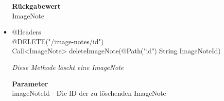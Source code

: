 \begin{itemize}
        		\textbf{Rückgabewert} \\
                ImageNote
                
                     \item{@Headers\\ @DELETE("/image-notes/{id}")\\Call<ImageNote> deleteImageNote(@Path("id") String ImageNoteId)}
        	
      	 	 	\textit{Diese Methode löscht eine ImageNote}
        	
        		\textbf{Parameter} \\
        		 imageNoteId - Die ID der zu löschenden ImageNote  
        	        		       	
       		 \end{itemize}
             
             
